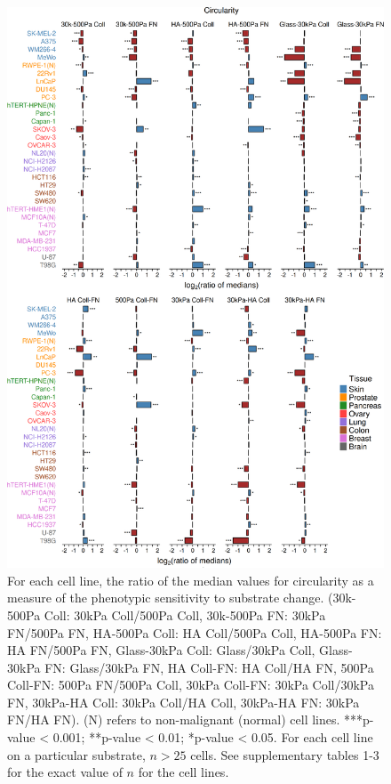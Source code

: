 \documentclass[11pt,letterpaper,english,oneside]{article} %
\begin{document}
\begin{figure}[H]
    \centering
    \includegraphics[scale=0.13]{../Figures/Supplementary_Figure3/supplementary_figure3.png}
    \caption{For each cell line, the ratio of the median values for circularity as a measure of the phenotypic sensitivity to substrate change. 
    (30k-500Pa Coll: 30kPa Coll/500Pa Coll, 30k-500Pa FN: 30kPa FN/500Pa FN, HA-500Pa Coll: HA Coll/500Pa Coll, HA-500Pa  FN: HA FN/500Pa FN, Glass-30kPa Coll: Glass/30kPa Coll, Glass-30kPa FN: Glass/30kPa FN, 
    HA Coll-FN: HA Coll/HA FN, 500Pa Coll-FN: 500Pa FN/500Pa Coll, 30kPa Coll-FN: 30kPa Coll/30kPa FN, 30kPa-HA Coll: 30kPa Coll/HA Coll, 30kPa-HA FN: 30kPa FN/HA FN). (N) refers to non-malignant (normal) cell lines.
    ***p-value < 0.001; **p-value < 0.01; *p-value < 0.05. For each cell line on a particular substrate, $n > 25$ cells. See supplementary tables 1-3 for the exact value of $n$ for the cell lines.}
    \label{fig:fig3}
\end{figure}
\end{document}
